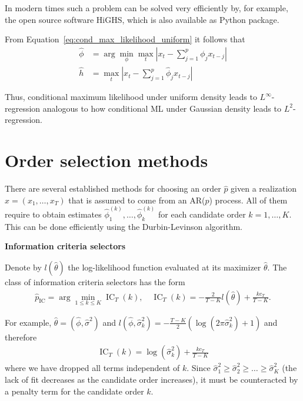 In modern times such a problem can be solved very efficiently by, for example, the open source software HiGHS, which is also available as Python package.

From Equation~\eqref{eq:cond_max_likelihood_uniform} it follows that
\begin{align*}
    \hat{\phi}&=\arg\min_{\phi}\max_t\left|x_t-\sum_{j=1}^{p}\phi_jx_{t-j}\right|\\
    \hat{h}&=\max_t\left|x_t-\sum_{j=1}^{p}\hat{\phi}_jx_{t-j}\right|
\end{align*}

Thus, conditional maximum likelihood under uniform density leads to $L^{\infty}$-regression analogous to how conditional ML under Gaussian density leads to $L^2$-regression.

\section{Order selection methods}\label{sec:classical_order_selection_methods}

There are several established methods for choosing an order $\hat{p}$ given a realization $x=(x_1,\dots,x_T)$ that is assumed to come from an AR($p$) process. All of them require to obtain estimates $\hat{\phi}_1^{(k)},\dots,\hat{\phi}_k^{(k)}$ for each candidate order $k=1,\dots,K$. This can be done efficiently using the Durbin-Levinson algorithm.

\textbf{Information criteria selectors}

Denote by $l(\hat{\theta})$ the log-likelihood function evaluated at its maximizer $\hat{\theta}$. The class of information criteria selectors has the form
\begin{align*}
    \hat{p}_{\operatorname{IC}}=\arg\min_{1\le k\le K}\operatorname{IC}_T(k),\quad\operatorname{IC}_T(k)=-\frac{2}{T-K}l(\hat{\theta})+\frac{kc_T}{T-K}.
\end{align*}

For example, $\hat{\theta}=(\hat{\phi},\hat{\sigma}^2)$ and $l(\hat{\phi},\hat{\sigma}^2_k)=-\frac{T-K}{2}(\log{(2\pi\hat{\sigma}^2_k)}+1)$ and therefore
\begin{align*}
    \operatorname{IC}_T(k)=\log{(\hat{\sigma}_k^2)}+\frac{kc_T}{T-K}
\end{align*}
where we have dropped all terms independent of $k$. Since $\hat{\sigma}_1^2\ge\hat{\sigma}_2^2\ge\dots\ge\hat{\sigma}_K^2$ (the lack of fit decreases as the candidate order increases), it must be counteracted by a penalty term for the candidate order $k$.

